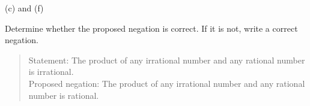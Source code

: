\documentclass[12pt,letterpaper, onecolumn]{exam}
\begin{document}
\begin{questions}
		
		\begin{solution}
			(c) and (f)
		\end{solution}
		\begin{center}
			Determine whether the proposed negation is correct. If it is not, write a correct negation.\\
		\end{center}
		\setcounter{question}{11}\question 
		\begin{quote}
			Statement: The product of any irrational number and any rational number is irrational.\\
			Proposed negation: The product of any irrational number and any rational number is rational.\\
		\end{quote}
		

\end{questions}
\end{document}
